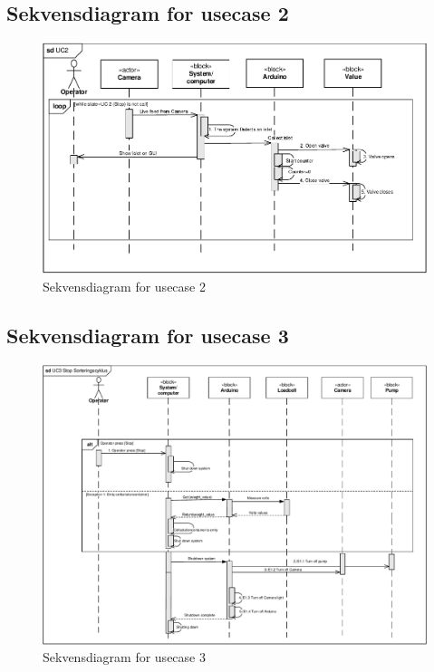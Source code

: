 \subsection{Sekvensdiagram for usecase 2} 
\begin{figure}[H]
	\centering
	\includegraphics[width=1\textwidth]{pdf/UC2_cropped.pdf}
	\caption{Sekvensdiagram for usecase 2}
	\label{fig:uc1}
\end{figure}

\subsection{Sekvensdiagram for usecase 3} 
\begin{figure}[H]
	\centering
	\includegraphics[width=1\textwidth]{pdf/UC3_cropped.pdf}
	\caption{Sekvensdiagram for usecase 3}
	\label{fig:uc1}
\end{figure}

